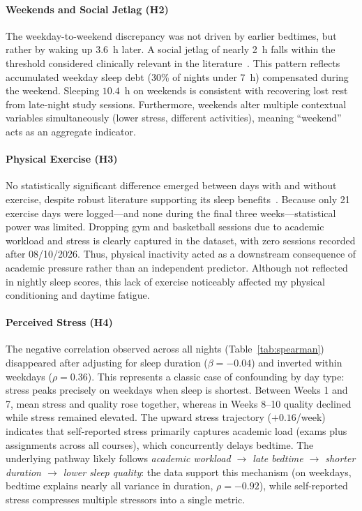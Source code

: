 \documentclass[conference]{IEEEtran}
\begin{document}
\paragraph{Weekends and Social Jetlag (H2)}
The weekday-to-weekend discrepancy was not driven by earlier bedtimes, but rather by waking up $3.6$~h later. A social jetlag of nearly 2~h falls within the threshold considered clinically relevant in the literature~\cite{ref8,ref9}. This pattern reflects accumulated weekday sleep debt (30\% of nights under 7~h) compensated during the weekend. Sleeping $10.4$~h on weekends is consistent with recovering lost rest from late-night study sessions. Furthermore, weekends alter multiple contextual variables simultaneously (lower stress, different activities), meaning ``weekend'' acts as an aggregate indicator.

\paragraph{Physical Exercise (H3)}
No statistically significant difference emerged between days with and without exercise, despite robust literature supporting its sleep benefits~\cite{ref16}. Because only 21 exercise days were logged—and none during the final three weeks—statistical power was limited. Dropping gym and basketball sessions due to academic workload and stress is clearly captured in the dataset, with zero sessions recorded after 08/10/2026. Thus, physical inactivity acted as a downstream consequence of academic pressure rather than an independent predictor. Although not reflected in nightly sleep scores, this lack of exercise noticeably affected my physical conditioning and daytime fatigue.

\paragraph{Perceived Stress (H4)}
The negative correlation observed across all nights (Table~\ref{tab:spearman}) disappeared after adjusting for sleep duration ($\beta=-0.04$) and inverted within weekdays ($\rho=0.36$). This represents a classic case of confounding by day type: stress peaks precisely on weekdays when sleep is shortest. Between Weeks 1 and 7, mean stress and quality rose together, whereas in Weeks 8--10 quality declined while stress remained elevated. The upward stress trajectory ($+0.16$/week) indicates that self-reported stress primarily captures academic load (exams plus assignments across all courses), which concurrently delays bedtime. The underlying pathway likely follows \textit{academic workload $\rightarrow$ late bedtime $\rightarrow$ shorter duration $\rightarrow$ lower sleep quality}: the data support this mechanism (on weekdays, bedtime explains nearly all variance in duration, $\rho=-0.92$), while self-reported stress compresses multiple stressors into a single metric.
\end{document}
